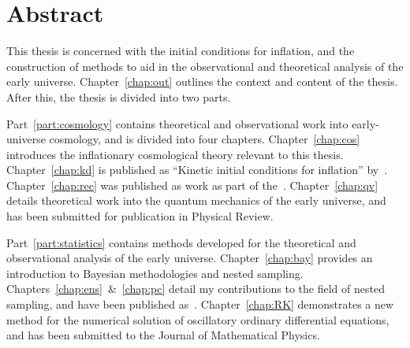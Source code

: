 \chapter*{Abstract}
\label{chap:abstract}

This thesis is concerned with the initial conditions for inflation, and the construction of methods to aid in the observational and theoretical analysis of the early universe.
Chapter~\ref{chap:out} outlines the context and content of the thesis. After this, the thesis is divided into two parts.

Part~\ref{part:cosmology} contains theoretical and observational work into early-universe cosmology, and is divided into four chapters. Chapter~\ref{chap:cos} introduces the inflationary cosmological theory relevant to this thesis. Chapter~\ref{chap:kd} is published as ``Kinetic initial conditions for inflation'' by~\cite{Handley+2014}. Chapter~\ref{chap:rec} was published as work as part of the~\cite{planck2015-a24}. Chapter~\ref{chap:qv} details theoretical work into the quantum mechanics of the early universe, and has been submitted for publication in Physical Review.

Part~\ref{part:statistics} contains methods developed for the theoretical and observational analysis of the early universe. Chapter~\ref{chap:bay} provides an introduction to Bayesian methodologies and nested sampling.
Chapters~\ref{chap:ens}~\&~\ref{chap:pc} detail my contributions to the field of nested sampling, and have been published as~\cite{polychordletter,polychordpaper}.
Chapter~\ref{chap:RK} demonstrates a new method for the numerical solution of oscillatory ordinary differential equations, and has been submitted to the Journal of Mathematical Physics.

\cleardoublepage{}
